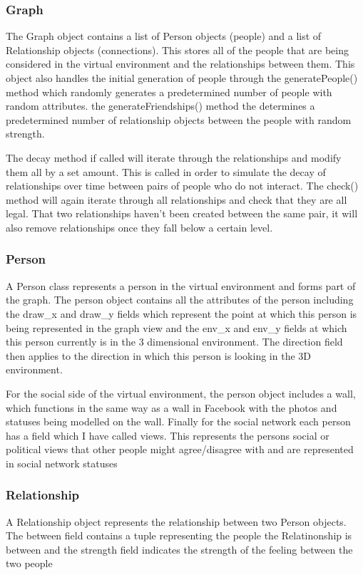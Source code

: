 \documentclass[12pt,a4paper]{article}
\begin{document}
\subsubsection{Graph}
The Graph object contains a list of Person objects (people) and a list of Relationship objects (connections). This stores all of the people that are being considered in the virtual environment and the relationships between them. This object also handles the initial generation of people through the generatePeople() method which randomly generates a predetermined number of people with random attributes. the generateFriendships() method the determines a predetermined number of relationship objects between the people with random strength.

The decay method if called will iterate through the relationships and modify them all by a set amount. This is called in order to simulate the decay of relationships over time between pairs of people who do not interact. The check() method will again iterate through all relationships and check that they are all legal. That two relationships haven't been created between the same pair, it will also remove relationships once they fall below a certain level.

\subsubsection{Person}
A Person class represents a person in the virtual environment and forms part of the graph. The person object contains all the attributes of the person including the draw\_x and draw\_y fields which represent the point at which this person is being represented in the graph view and the env\_x and env\_y fields at which this person currently is in the 3 dimensional environment. The direction field then applies to the direction in which this person is looking in the 3D environment.

For the social side of the virtual environment, the person object includes a wall, which functions in the same way as a wall in Facebook with the photos and statuses being modelled on the wall. Finally for the social network each person has a field which I have called views. This represents the persons social or political views that other people might agree/disagree with and are represented in social network statuses

\subsubsection{Relationship}
A Relationship object represents the relationship between two Person objects. The between field contains a tuple representing the people the Relatinonship is between and the strength field indicates the strength of the feeling between the two people
\end{document}
